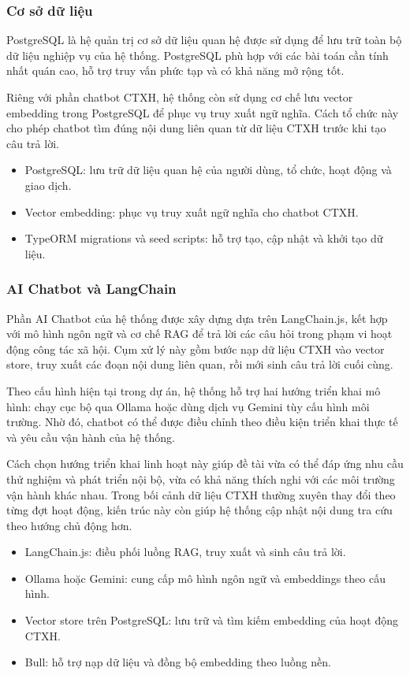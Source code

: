 \subsubsection{Cơ sở dữ liệu}
PostgreSQL là hệ quản trị cơ sở dữ liệu quan hệ được sử dụng để lưu trữ toàn bộ dữ liệu nghiệp vụ của hệ thống. PostgreSQL phù hợp với các bài toán cần tính nhất quán cao, hỗ trợ truy vấn phức tạp và có khả năng mở rộng tốt.

Riêng với phần chatbot CTXH, hệ thống còn sử dụng cơ chế lưu vector embedding trong PostgreSQL để phục vụ truy xuất ngữ nghĩa. Cách tổ chức này cho phép chatbot tìm đúng nội dung liên quan từ dữ liệu CTXH trước khi tạo câu trả lời.

\begin{itemize}
    \item PostgreSQL: lưu trữ dữ liệu quan hệ của người dùng, tổ chức, hoạt động và giao dịch.
    \item Vector embedding: phục vụ truy xuất ngữ nghĩa cho chatbot CTXH.
    \item TypeORM migrations và seed scripts: hỗ trợ tạo, cập nhật và khởi tạo dữ liệu.
\end{itemize}

\subsubsection{AI Chatbot và LangChain}
Phần AI Chatbot của hệ thống được xây dựng dựa trên LangChain.js, kết hợp với mô hình ngôn ngữ và cơ chế RAG để trả lời các câu hỏi trong phạm vi hoạt động công tác xã hội. Cụm xử lý này gồm bước nạp dữ liệu CTXH vào vector store, truy xuất các đoạn nội dung liên quan, rồi mới sinh câu trả lời cuối cùng.

Theo cấu hình hiện tại trong dự án, hệ thống hỗ trợ hai hướng triển khai mô hình: chạy cục bộ qua Ollama hoặc dùng dịch vụ Gemini tùy cấu hình môi trường. Nhờ đó, chatbot có thể được điều chỉnh theo điều kiện triển khai thực tế và yêu cầu vận hành của hệ thống.

    Cách chọn hướng triển khai linh hoạt này giúp đề tài vừa có thể đáp ứng nhu cầu thử nghiệm và phát triển nội bộ, vừa có khả năng thích nghi với các môi trường vận hành khác nhau. Trong bối cảnh dữ liệu CTXH thường xuyên thay đổi theo từng đợt hoạt động, kiến trúc này còn giúp hệ thống cập nhật nội dung tra cứu theo hướng chủ động hơn.

\begin{itemize}
    \item LangChain.js: điều phối luồng RAG, truy xuất và sinh câu trả lời.
    \item Ollama hoặc Gemini: cung cấp mô hình ngôn ngữ và embeddings theo cấu hình.
    \item Vector store trên PostgreSQL: lưu trữ và tìm kiếm embedding của hoạt động CTXH.
    \item Bull: hỗ trợ nạp dữ liệu và đồng bộ embedding theo luồng nền.
\end{itemize}

